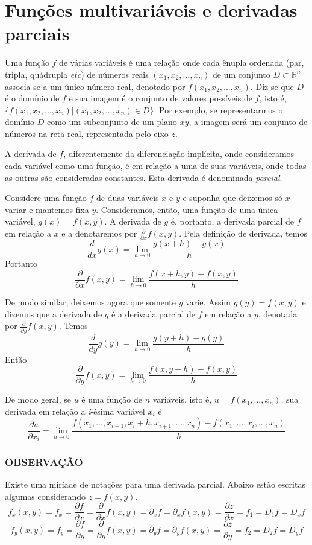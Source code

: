 \documentclass[a4paper, 12pt]{extreport}
\begin{document}
  \chapter{Funções multivariáveis e derivadas parciais}
    Uma função $f$ de várias variáveis é uma relação onde cada ênupla ordenada (par, tripla, quádrupla \textit{etc}) de números reais $(x_1, x_2, ..., x_n)$
    de um conjunto $D \subset \mathbb{R}^n$ associa-se a um único número real, denotado por $f(x_1, x_2, ..., x_n)$. Diz-se que $D$ é o domínio de $f$
    e sua imagem é o conjunto de valores possíveis de $f$, isto é, $\{f(x_1, x_2, ..., x_n) | (x_1, x_2, ..., x_n) \in D\}$. Por exemplo, se representarmos
    o domínio $D$ como um subconjunto de um plano $xy$, a imagem será um conjunto de números na reta real, representada pelo eixo $z$.

    A derivada de $f$, diferentemente da diferenciação implícita, onde consideramos cada variável como uma função, é em relação a uma de suas variáveis, onde
    todas as outras são consideradas constantes. Esta derivada é denominada \textsl{parcial}.

    Considere uma função $f$ de duas variáveis $x$ e $y$ e suponha que deixemos só $x$ variar e mantemos fixa $y$. Consideramos, então,
    uma função de uma única variável, $g(x) = f(x, y)$. A derivada de $g$ é, portanto, a derivada parcial de $f$ em relação a $x$ e a
    denotaremos por $\frac{\partial}{\partial x}f(x, y)$. Pela definição de derivada, temos
    $$ \frac{d}{dx}g(x) = \lim_{h \to 0}{\frac{g(x+h) - g(x)}{h}} $$
    Portanto
    $$ \frac{\partial}{\partial x}f(x, y) = \lim_{h \to 0}{\frac{f(x+h, y) - f(x, y)}{h}} $$

    De modo similar, deixemos agora que somente $y$ varie. Assim $g(y) = f(x, y)$ e dizemos que a derivada de $g$ é a derivada parcial de $f$ em relação a $y$,
    denotada por $\frac{\partial}{\partial y}f(x, y)$. Temos
    $$ \frac{d}{dy}g(y) = \lim_{h \to 0}{\frac{g(y+h) - g(y)}{h}} $$
    Então
    $$ \frac{\partial}{\partial y}f(x, y) = \lim_{h \to 0}{\frac{f(x, y+h) - f(x, y)}{h}} $$

    De modo geral, se $u$ é uma função de $n$ variáveis, isto é, $u=f(x_1,...,x_n)$, sua derivada em relação a \textsl{i}-ésima variável $x_i$ é
    $$ \frac{\partial u}{\partial x_i} = \lim_{h \to 0}{\frac{f(x_1,..., x_{i-1}, x_i+h, x_{i+1},..., x_n) - f(x_1,...,x_i,...,x_n)}{h}} $$

    \subsection*{\color{coverup}\small OBSERVAÇÃO}
      Existe uma miríade de notações para uma derivada parcial. Abaixo estão escritas algumas considerando $z = f(x, y)$.
      $$ f_x(x, y) = f_x = \frac{\partial f}{\partial x} = \frac{\partial}{\partial x}f(x, y) = \partial_xf = \partial_xf(x, y) = \frac{\partial z}{\partial x} = f_1 = D_1f = D_xf$$
      $$ f_y(x, y) = f_y = \frac{\partial f}{\partial y} = \frac{\partial}{\partial y}f(x, y) = \partial_yf = \partial_yf(x, y) = \frac{\partial z}{\partial y} = f_2 = D_2f = D_yf$$
\end{document}
